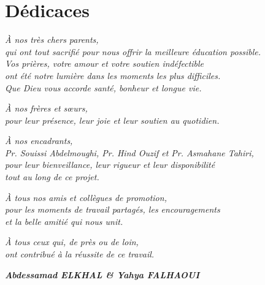 \documentclass[12pt,a4paper]{report}
\begin{document}
\clearpage
\chapter*{Dédicaces}

\vspace*{3cm}

\begin{center}

\textit{À nos très chers parents,}\\[0.4cm]
\textit{qui ont tout sacrifié pour nous offrir la meilleure éducation possible.}\\[0.4cm]
\textit{Vos prières, votre amour et votre soutien indéfectible}\\
\textit{ont été notre lumière dans les moments les plus difficiles.}\\[0.4cm]
\textit{Que Dieu vous accorde santé, bonheur et longue vie.}

\vspace{1.5cm}

\textit{À nos frères et sœurs,}\\[0.4cm]
\textit{pour leur présence, leur joie et leur soutien au quotidien.}

\vspace{1.5cm}

\textit{À nos encadrants,}\\[0.4cm]
\textit{Pr. Souissi Abdelmoughi, Pr. Hind Ouzif et Pr. Asmahane Tahiri,}\\[0.4cm]
\textit{pour leur bienveillance, leur rigueur et leur disponibilité}\\
\textit{tout au long de ce projet.}

\vspace{1.5cm}

\textit{À tous nos amis et collègues de promotion,}\\[0.4cm]
\textit{pour les moments de travail partagés, les encouragements}\\
\textit{et la belle amitié qui nous unit.}

\vspace{1.5cm}

\textit{À tous ceux qui, de près ou de loin,}\\[0.4cm]
\textit{ont contribué à la réussite de ce travail.}

\vspace{2cm}

\textit{\textbf{Abdessamad ELKHAL \& Yahya FALHAOUI}}

\end{center}
\end{document}
